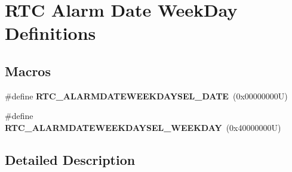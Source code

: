 \hypertarget{group___r_t_c___alarm_date_week_day___definitions}{}\section{R\+TC Alarm Date Week\+Day Definitions}
\label{group___r_t_c___alarm_date_week_day___definitions}
\subsection*{Macros}
\begin{DoxyCompactItemize}
\item 
\mbox{\label{group___r_t_c___alarm_date_week_day___definitions_ga038032416e6bcf81e842f60dcfe91e15}} 
\#define {\bfseries R\+T\+C\+\_\+\+A\+L\+A\+R\+M\+D\+A\+T\+E\+W\+E\+E\+K\+D\+A\+Y\+S\+E\+L\+\_\+\+D\+A\+TE}~(0x00000000\+U)
\item 
\mbox{\label{group___r_t_c___alarm_date_week_day___definitions_ga3dfe8546eb760b9928900ac80a27e625}} 
\#define {\bfseries R\+T\+C\+\_\+\+A\+L\+A\+R\+M\+D\+A\+T\+E\+W\+E\+E\+K\+D\+A\+Y\+S\+E\+L\+\_\+\+W\+E\+E\+K\+D\+AY}~(0x40000000\+U)
\end{DoxyCompactItemize}


\subsection{Detailed Description}
